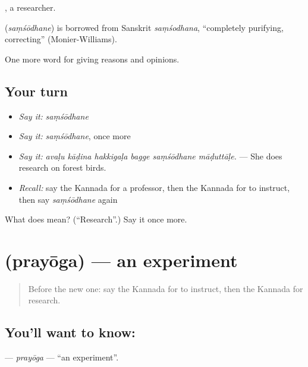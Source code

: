 , a researcher.

\begin{cousinweb}
\textbf{} (\emph{saṃśōdhane}) is borrowed from Sanskrit \emph{saṃśodhana}, \textquotedblleft{}completely purifying, correcting\textquotedblright{} (Monier-Williams).
\end{cousinweb}

\begin{grammarlens}[title={What you've built}]
One more word for giving reasons and opinions.
\end{grammarlens}

\subsection*{Your turn}
\begin{itemize}
\raggedright
  \item \emph{Say it:} \emph{saṃśōdhane}
  \item \emph{Say it:} \emph{saṃśōdhane}, once more
  \item \emph{Say it:} \emph{avaḷu kāḍina hakkigaḷa bagge saṃśōdhane māḍuttāḷe.} — She does research on forest birds.
  \item \emph{Recall:} say the Kannada for a professor, then the Kannada for to instruct, then say \emph{saṃśōdhane} again
\end{itemize}

\begin{tcolorbox}[breakable,colback=teal!4,colframe=teal!35!black,title={Before you move on}]
What does  mean? (\textquotedblleft{}Research\textquotedblright{}.) Say it once more.
\end{tcolorbox}
\section[\texorpdfstring{\kn{ಪ್ರಯೋಗ} (prayōga)}{ಪ್ರಯೋಗ (prayōga)}]{ (prayōga) — an experiment}

\label{lesson:KA-C407-prayoga}



\begin{quote}
Before the new one: say the Kannada for to instruct, then the Kannada for research.
\end{quote}

\subsection*{You'll want to know: }
\textbf{} — \emph{prayōga} — \textquotedblleft{}an experiment\textquotedblright{}.

